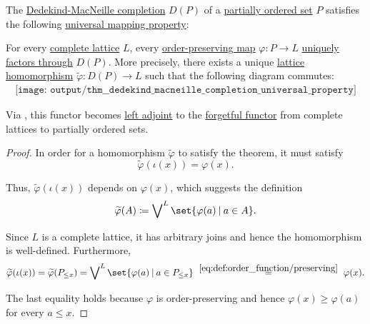 \begin{theorem}\label{thm:dedekind_macneille_completion_universal_property}
  The \hyperref[def:dedekind_macnielle_completion]{Dedekind-MacNeille completion} \( D(P) \) of a \hyperref[def:partially_ordered_set]{partially ordered set} \( P \) satisfies the following \hyperref[rem:universal_mapping_property]{universal mapping property}:
  \begin{displayquote}
    For every \hyperref[def:lattice]{complete lattice} \( L \), every \hyperref[def:order_function/preserving]{order-preserving map} \( \varphi: P \to L \) \hyperref[def:factors_through]{uniquely factors through} \( D(P) \). More precisely, there exists a unique \hyperref[def:lattice/homomorphism]{lattice homomorphism} \( \widetilde{\varphi}: D(P) \to L \) such that the following diagram commutes:
    \begin{equation}\label{eq:thm:dedekind_macneille_completion_universal_property/diagram}
      \begin{aligned}
        \texttt{[image: output/thm\_\_dedekind\_macneille\_completion\_universal\_property]}
      \end{aligned}
    \end{equation}
  \end{displayquote}
\end{theorem}
\begin{comments}
  \item Via , this functor becomes \hyperref[def:category_adjunction]{left adjoint} to the \hyperref[def:concrete_category]{forgetful functor} from complete lattices to partially ordered sets.
\end{comments}
\begin{proof}
  In order for a homomorphism \( \widetilde{\varphi} \) to satisfy the theorem, it must satisfy
  \begin{equation*}
    \widetilde{\varphi}(\iota(x)) = \varphi(x).
  \end{equation*}

  Thus, \( \widetilde{\varphi}(\iota(x)) \) depends on \( \varphi(x) \), which suggests the definition
  \begin{equation*}
    \widetilde{\varphi}(A) \coloneqq \bigvee\nolimits^L \set{ \varphi(a) \given a \in A }.
  \end{equation*}

  Since \( L \) is a complete lattice, it has arbitrary joins and hence the homomorphism is well-defined. Furthermore,
  \begin{equation*}
    \widetilde{\varphi}(\iota(x))
    =
    \widetilde{\varphi}(P_{\leq x})
    =
    \bigvee\nolimits^L \set{ \varphi(a) \given a \in P_{\leq x} }
    \reloset {\eqref{eq:def:order_function/preserving}} =
    \varphi(x).
  \end{equation*}

  The last equality holds because \( \varphi \) is order-preserving and hence \( \varphi(x) \geq \varphi(a) \) for every \( a \leq x \).
\end{proof}

